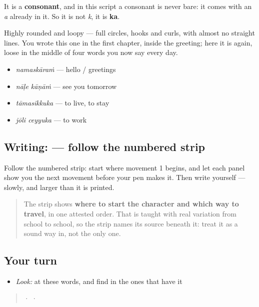 It is a \textbf{consonant}, and in this script a consonant is never bare: it comes with an \emph{a} already in it. So it is not \emph{k}, it is \textbf{ka}.

Highly rounded and loopy — full circles, hooks and curls, with almost no straight lines. You wrote this one in the first chapter, inside the greeting; here it is again, loose in the middle of four words you now say every day.

\begin{itemize}
\raggedright
  \item \textbf{} \emph{namaskāraṁ} — hello / greetings
  \item \textbf{ } \emph{nāḷe kāṇāṁ} — see you tomorrow
  \item \textbf{} \emph{tāmasikkuka} — to live, to stay
  \item \textbf{ } \emph{jōli ceyyuka} — to work
\end{itemize}

\subsection*{Writing:  — follow the numbered strip}

Follow the numbered strip: start where movement 1 begins, and let each panel show you the next movement before your pen makes it. Then write  yourself — slowly, and larger than it is printed.

\begin{quote}
The strip shows \textbf{where to start the character and which way to travel}, in one attested order. That is taught with real variation from school to school, so the strip names its source beneath it: treat it as a sound way in, not the only one.
\end{quote}

\subsection*{Your turn}
\begin{itemize}
\raggedright
  \item \emph{Look:} at these words, and find  in the ones that have it
\end{itemize}

\begin{quote}
  ·     ·  
\end{quote}


